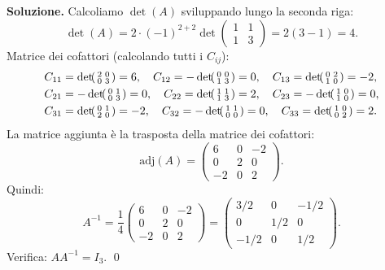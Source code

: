 \textbf{Soluzione.} Calcoliamo $\det(A)$ sviluppando lungo la seconda riga:
\[ \det(A) = 2 \cdot (-1)^{2+2} \det\begin{pmatrix} 1 & 1 \\ 1 & 3 \end{pmatrix} = 2(3 - 1) = 4. \]
Matrice dei cofattori (calcolando tutti i $C_{ij}$):
\begin{align*}
    C_{11} &= \det\!\begin{psmallmatrix} 2 & 0 \\ 0 & 3 \end{psmallmatrix} = 6, \quad
    C_{12} = -\det\!\begin{psmallmatrix} 0 & 0 \\ 1 & 3 \end{psmallmatrix} = 0, \quad
    C_{13} = \det\!\begin{psmallmatrix} 0 & 2 \\ 1 & 0 \end{psmallmatrix} = -2, \\
    C_{21} &= -\det\!\begin{psmallmatrix} 0 & 1 \\ 0 & 3 \end{psmallmatrix} = 0, \quad
    C_{22} = \det\!\begin{psmallmatrix} 1 & 1 \\ 1 & 3 \end{psmallmatrix} = 2, \quad
    C_{23} = -\det\!\begin{psmallmatrix} 1 & 0 \\ 1 & 0 \end{psmallmatrix} = 0, \\
    C_{31} &= \det\!\begin{psmallmatrix} 0 & 1 \\ 2 & 0 \end{psmallmatrix} = -2, \quad
    C_{32} = -\det\!\begin{psmallmatrix} 1 & 1 \\ 0 & 0 \end{psmallmatrix} = 0, \quad
    C_{33} = \det\!\begin{psmallmatrix} 1 & 0 \\ 0 & 2 \end{psmallmatrix} = 2.
\end{align*}
La matrice aggiunta è la trasposta della matrice dei cofattori:
\[ \text{adj}(A) = \begin{pmatrix} 6 & 0 & -2 \\ 0 & 2 & 0 \\ -2 & 0 & 2 \end{pmatrix}. \]
Quindi:
\[ A^{-1} = \frac{1}{4}\begin{pmatrix} 6 & 0 & -2 \\ 0 & 2 & 0 \\ -2 & 0 & 2 \end{pmatrix} = \begin{pmatrix} 3/2 & 0 & -1/2 \\ 0 & 1/2 & 0 \\ -1/2 & 0 & 1/2 \end{pmatrix}. \]
Verifica: $AA^{-1} = I_3$. \checkmark \qed

